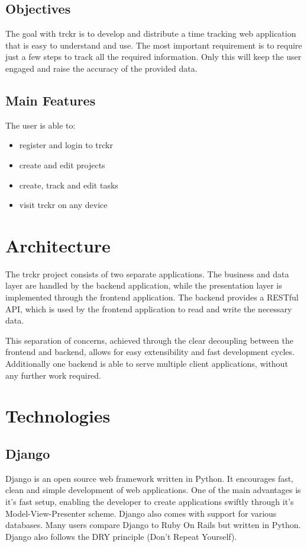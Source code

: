 \documentclass[bibliography=totoc, listof=totocnumbered]{scrartcl}
\begin{document}
\subsection{Objectives}
The goal with trckr is to develop and distribute a time tracking web application
that is easy to understand and use. The most important requirement is to
require just a few steps to track all the required information. Only this will
keep the user engaged and raise the accuracy of the provided data.

\subsection{Main Features}
The user is able to:
\begin{itemize}
    \item register and login to trckr
    \item create and edit projects
    \item create, track and edit tasks
    \item visit trckr on any device
\end{itemize}

\section{Architecture}
The trckr project consists of two separate applications. The business and data layer are  handled by the backend application, while the presentation layer is implemented through the frontend application. The backend provides a RESTful API, which is used by the frontend application to read and write the necessary data.

This separation of concerns, achieved through the clear decoupling between the frontend and backend, allows for easy extensibility and fast development cycles. Additionally one backend is able to serve multiple client applications, without any further work required.

\section{Technologies}
\subsection{Django}
Django is an open source web framework written in Python.\cite{django} It encourages fast,
clean and simple development of web applications. One of the main advantages is
it's fast setup, enabling the developer to create applications swiftly through
it's Model-View-Presenter scheme. Django also comes with support for various
databases. Many users compare Django to Ruby On Rails but written in Python.
Django also follows the DRY principle (Don't Repeat Yourself).
\end{document}
